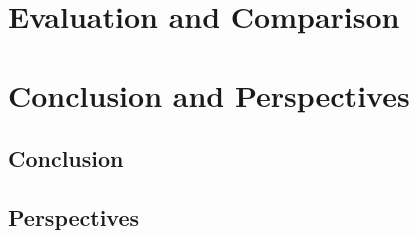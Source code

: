 \documentclass[runningheads]{llncs}
\begin{document}
\section{Evaluation and Comparison}

\section{Conclusion and Perspectives}
\subsection{Conclusion}
\subsection{Perspectives}



\end{document}
